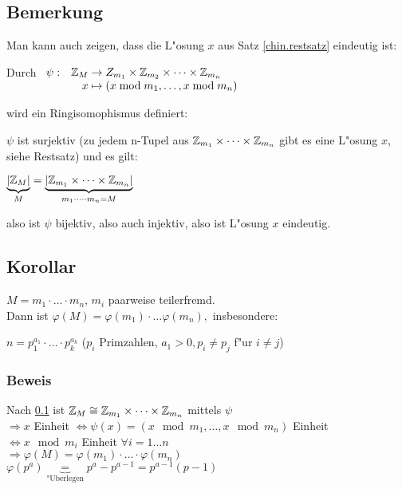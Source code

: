 \subsection{Bemerkung} \label{chinsatzeindeutig}
Man kann auch zeigen, dass die L"osung $x$ aus Satz \ref{chin.restsatz} eindeutig ist:

Durch 
$\begin{array}[t]{lr@{\;}c@{\;}l}
\psi:&	\Z_M &\to&  Z_{m_1} \times \Z_{m_2} \times \dots \times \Z_{m_n} \\
&	x	&\mapsto& (x \mod{m_1}, \dots, x \mod{m_n})
\end{array}$

wird ein Ringisomophismus definiert:

$\psi$ ist surjektiv (zu jedem n-Tupel aus $\mathbb{Z}_{m_1}\times \dots \times \mathbb{Z}_{m_n}$ gibt es eine L"osung $x$, siehe Restsatz) und es gilt:

$\underbrace{|\mathbb{Z}_M|}_{M}=\underbrace{|\mathbb{Z}_{m_1}\times \dots \times \mathbb{Z}_{m_n}|}_{m_1\cdot \dots \cdot m_n = M}$

also ist $\psi$ bijektiv, also auch injektiv, also ist L"osung $x$ eindeutig.

\subsection[Korollar: Phi-Funktion berechnen]{Korollar}
$M=m_1\cdot \dots \cdot m_n$, $m_i$ paarweise teilerfremd.\\
Dann ist $\varphi(M)=\varphi(m_1)\cdot \dots \varphi(m_n),$ insbesondere:

$n=p^{a_1}_1 \cdot \dots \cdot p^{a_k}_k$ ($p_i$ Primzahlen, $a_1>0, p_i \neq p_j$ f"ur $i\neq j$)

\subsubsection*{Beweis}

Nach \ref{chinsatzeindeutig} ist $\mathbb{Z}_M \cong \mathbb{Z}_{m_1} \times \dots \times \mathbb{Z}_{m_n}$ mittels $\psi$\\
$\Rightarrow x$ Einheit $\Leftrightarrow \psi(x) = ( x\mod{m_1}, \dots, x \mod{m_n})$ Einheit
\\ $\Leftrightarrow x \mod{m_i}$ Einheit $\forall i = 1 \dots n$\\
$\Rightarrow \varphi(M) = \varphi(m_1) \cdot \dots \cdot \varphi(m_n)$\\
$\varphi(p^a)\underbrace{=}_{\text{"Uberlegen}}p^a - p^{a-1} = p^{a-1}(p-1)$

